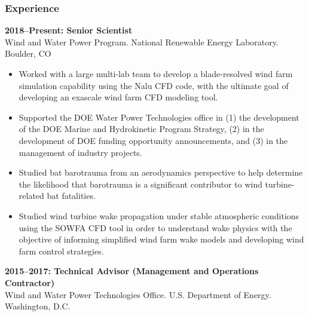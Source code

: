 \subsubsection*{\large{Experience}}
\vspace{-0.15in}

\textbf{2018--Present: Senior Scientist} \\
Wind and Water Power Program. National Renewable Energy Laboratory. Boulder, CO\\
\vspace{-0.35in}
\begin{itemize}
  \item Worked with a large multi-lab team to develop a blade-resolved wind farm simulation capability using the Nalu CFD code, with the ultimate goal of developing an exascale wind farm CFD modeling tool.
  \vspace{-0.1in}
  \item Supported the DOE Water Power Technologies office in (1) the development of the DOE Marine and Hydrokinetic Program Strategy, (2) in the development of DOE funding opportunity announcements, and (3) in the management of industry projects.
  \vspace{-0.1in}
  \item Studied bat barotrauma from an aerodynamics perspective to help determine the likelihood that barotrauma is a significant contributor to wind turbine-related bat fatalities.
  \vspace{-0.1in}
  \item Studied wind turbine wake propagation under stable atmospheric conditions using the SOWFA CFD tool in order to understand wake physics with the objective of informing simplified wind farm wake models and developing wind farm control strategies.
\end{itemize}
\vspace{-0.1in}
\textbf{2015--2017: Technical Advisor (Management and Operations Contractor)}\\
Wind and Water Power Technologies Office. U.S. Department of Energy. Washington, D.C.\\
\vspace{-0.35in}
